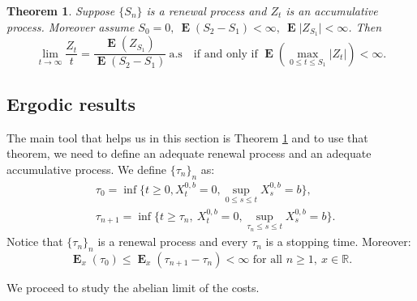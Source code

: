 \documentclass{article}
\newtheorem{theorem}[thm]{Theorem}
\newcommand\E{\operatorname{\mathbf{E}}}
\begin{document}
\begin{theorem}\label{ChToolsT:asmussen}\cite[Chapter VI, Theorem 3.1]{ASMUSSENQUEUES}
Suppose $\lbrace S_n \rbrace$ is a renewal process and $Z_t$ is an accumulative process. Moreover assume $S_0=0, \ \E (S_2-S_1)< \infty, \ \E \vert Z_{S_1} \vert < \infty$. Then 
$$\lim_{t \to \infty} \frac{Z_t}{t} =  \frac{\E(Z_{S_1})}{\E(S_2-S_1)} \ \text{a.s} \quad \text{if and only if } \E \left(\max_{0 \leq t \leq S_1}\vert Z_t \vert \right) < \infty. $$
\end{theorem}

\subsection{Ergodic results}
The main tool that helps us in this section is Theorem \ref{ChToolsT:asmussen} and to use that theorem, we need to define an adequate renewal process and an adequate accumulative process.
 We define $\lbrace \tau_n \rbrace_n $ as:
\begin{align*}
&\tau_0 = \inf \lbrace t \geq 0, X^{0,b}_t=0, \sup_{0 \leq s \leq t} X^{0,b}_s=b \rbrace , \\
&\tau_{n+1}  = \inf \lbrace t \geq \tau_n,\ X^{0,b}_t=0, \sup_{\tau_n  \leq s \leq t} X^{0,b}_s=b \rbrace  .
\end{align*}
Notice that $\lbrace \tau_n \rbrace_n$ is a renewal process and every $\tau_n$ is a stopping time. Moreover: 
\begin{equation}\label{eq:renewalbounded}
 \E_x (\tau_0) \leq \E_x(\tau_{n+1}-\tau_n)< \infty  \text{ for all } n \geq 1, \ x \in \mathbb{R}.
 \end{equation}


%
We proceed to study the abelian limit of the costs.
\end{document}
